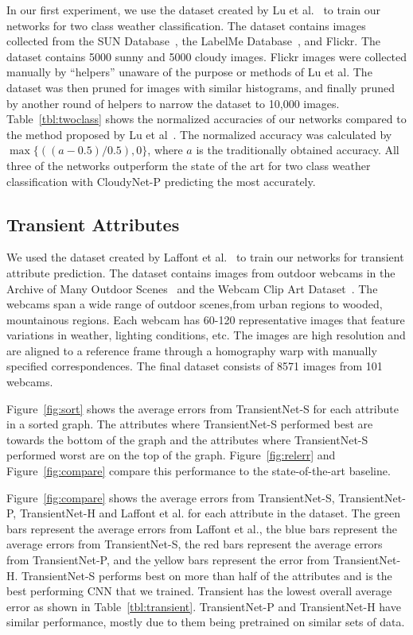 \documentclass{article}
\newcommand{\figref}[1]{Figure~\ref{fig:#1}}
\newcommand{\tblref}[1]{Table~\ref{tbl:#1}}
\begin{document}
In our first experiment, we use the dataset created by Lu et al.~\cite{lutwoclass} to train
our networks for two class weather classification.  The dataset
contains images collected from the SUN Database~\cite{xiaoSUN}, the
LabelMe Database~\cite{russell2008labelme}, and Flickr. The dataset
contains 5000 sunny and 5000 cloudy images. Flickr images were
collected manually by ``helpers'' unaware of the purpose or methods of
Lu et al. The dataset was then pruned for images with similar
histograms, and finally pruned by another round of helpers to narrow
the dataset to 10,000 images.  \tblref{twoclass} shows the normalized
accuracies of our networks compared to the method proposed by
Lu et al~\cite{lutwoclass}.  The normalized accuracy was calculated by
$ \max\{((a - 0.5) / 0.5), 0\} $, where $a$ is the traditionally
obtained accuracy. All three of the networks outperform the state of
the art for two class weather classification with CloudyNet-P
predicting the most accurately.

\subsection{Transient Attributes}

We used the dataset created by Laffont et al.~\cite{Laffont14} to
train our networks for transient attribute prediction. The dataset
contains images from outdoor webcams in the Archive of Many Outdoor
Scenes~\cite{jacobs07amos} and the Webcam Clip Art
Dataset~\cite{lalondesig09}.  The webcams span a wide range of outdoor
scenes,from urban regions to wooded, mountainous regions. Each webcam
has 60-120 representative images that feature variations in weather,
lighting conditions, etc.  The images are high resolution and are
aligned to a reference frame through a homography warp with manually
specified correspondences.  The final dataset consists of 8571 images
from 101 webcams.

\figref{sort} shows the average errors from TransientNet-S for each attribute
in a sorted graph.  The attributes where TransientNet-S performed best are towards
the bottom of the graph and the attributes where TransientNet-S performed
worst are on the top of the graph. \figref{relerr} and \figref{compare} 
compare this performance to the state-of-the-art baseline.

\figref{compare} shows the average errors from TransientNet-S, TransientNet-P, 
TransientNet-H and Laffont et al. for each attribute in the dataset.  The green bars 
represent the average errors from Laffont et al., the blue bars represent the average 
errors from TransientNet-S, the red bars represent the average errors from TransientNet-P, 
and the yellow bars represent the error from TransientNet-H. TransientNet-S performs best on 
more than half of the attributes and is the best performing CNN that we trained.  
Transient has the lowest overall average error as shown in \tblref{transient}.  TransientNet-P
and TransientNet-H have similar performance, mostly due to them being pretrained on similar 
sets of data.
\end{document}
